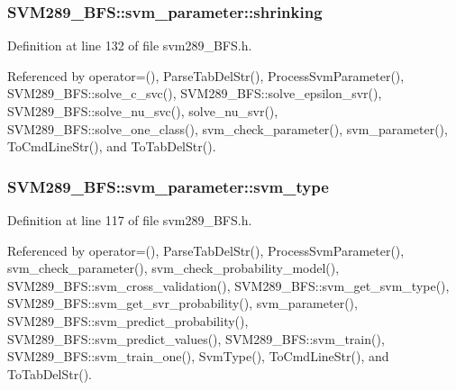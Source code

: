 \subsubsection[{\texorpdfstring{shrinking}{shrinking}}]{ S\+V\+M289\+\_\+\+B\+F\+S\+::svm\+\_\+parameter\+::shrinking}\hypertarget{struct_s_v_m289___b_f_s_1_1svm__parameter_a6a9d76d8aa331811b0f7da59ebc5a79a}{}\label{struct_s_v_m289___b_f_s_1_1svm__parameter_a6a9d76d8aa331811b0f7da59ebc5a79a}


Definition at line 132 of file svm289\+\_\+\+B\+F\+S.\+h.



Referenced by operator=(), Parse\+Tab\+Del\+Str(), Process\+Svm\+Parameter(), S\+V\+M289\+\_\+\+B\+F\+S\+::solve\+\_\+c\+\_\+svc(), S\+V\+M289\+\_\+\+B\+F\+S\+::solve\+\_\+epsilon\+\_\+svr(), S\+V\+M289\+\_\+\+B\+F\+S\+::solve\+\_\+nu\+\_\+svc(), solve\+\_\+nu\+\_\+svr(), S\+V\+M289\+\_\+\+B\+F\+S\+::solve\+\_\+one\+\_\+class(), svm\+\_\+check\+\_\+parameter(), svm\+\_\+parameter(), To\+Cmd\+Line\+Str(), and To\+Tab\+Del\+Str().

\subsubsection[{\texorpdfstring{svm\+\_\+type}{svm_type}}]{ S\+V\+M289\+\_\+\+B\+F\+S\+::svm\+\_\+parameter\+::svm\+\_\+type}\hypertarget{struct_s_v_m289___b_f_s_1_1svm__parameter_a670b1be49bd630113fbf92dce2ebd9c4}{}\label{struct_s_v_m289___b_f_s_1_1svm__parameter_a670b1be49bd630113fbf92dce2ebd9c4}


Definition at line 117 of file svm289\+\_\+\+B\+F\+S.\+h.



Referenced by operator=(), Parse\+Tab\+Del\+Str(), Process\+Svm\+Parameter(), svm\+\_\+check\+\_\+parameter(), svm\+\_\+check\+\_\+probability\+\_\+model(), S\+V\+M289\+\_\+\+B\+F\+S\+::svm\+\_\+cross\+\_\+validation(), S\+V\+M289\+\_\+\+B\+F\+S\+::svm\+\_\+get\+\_\+svm\+\_\+type(), S\+V\+M289\+\_\+\+B\+F\+S\+::svm\+\_\+get\+\_\+svr\+\_\+probability(), svm\+\_\+parameter(), S\+V\+M289\+\_\+\+B\+F\+S\+::svm\+\_\+predict\+\_\+probability(), S\+V\+M289\+\_\+\+B\+F\+S\+::svm\+\_\+predict\+\_\+values(), S\+V\+M289\+\_\+\+B\+F\+S\+::svm\+\_\+train(), S\+V\+M289\+\_\+\+B\+F\+S\+::svm\+\_\+train\+\_\+one(), Svm\+Type(), To\+Cmd\+Line\+Str(), and To\+Tab\+Del\+Str().

